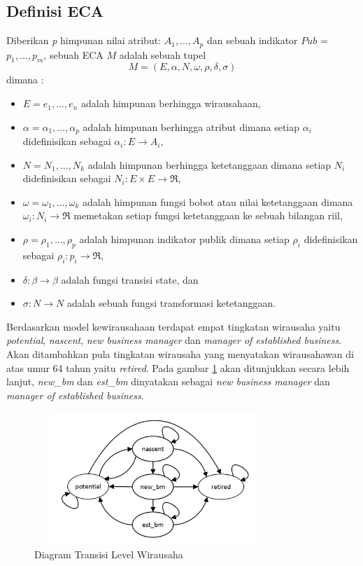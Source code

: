 \subsection{Definisi ECA}
Diberikan \textit{p} himpunan nilai atribut: $A_{1}, ..., A_{p}$ dan sebuah indikator $Pub$ = ${p_{1}, ..., p_{m}}$, sebuah ECA $M$ adalah sebuah tupel
\begin{displaymath}
	M = (E, \alpha, N, \omega, \rho, \delta, \sigma)
\end{displaymath}
dimana :
\begin{itemize}
	\item $E = {e_{1}, ..., e_{n}}$ adalah himpunan berhingga wirausahaan,
	\item $\alpha = {\alpha_{1}, ..., \alpha_{p}}$ adalah himpunan berhingga atribut dimana setiap $\alpha_{i}$ didefinisikan sebagai $\alpha_{i} : E \rightarrow A_{i}$,
	\item $N = {N_{1}, ..., N_{k}}$ adalah himpunan berhingga ketetanggaan dimana setiap $N_{i}$ didefinisikan sebagai $N_{i}:E \times E \rightarrow \Re$,
	\item $\omega = {\omega_{1}, ..., \omega_{k}}$ adalah himpunan fungsi bobot atau nilai ketetanggaan dimana $\omega_{i} : N_{i} \rightarrow \Re$ memetakan setiap fungsi ketetanggaan ke sebuah bilangan riil,
	\item $\rho = {\rho_{1}, ..., \rho_{p}}$ adalah himpunan indikator publik dimana setiap $\rho_{i}$ didefinisikan sebagai $\rho_{i} : p_{i} \rightarrow \Re$,
	\item $\delta : \beta \rightarrow \beta$ adalah fungsi transisi state, dan
	\item $\sigma : N \rightarrow N$ adalah sebuah fungsi transformasi ketetanggaan.
\end{itemize}


Berdasarkan model kewirausahaan terdapat empat tingkatan wirausaha yaitu \textit{potential}, \textit{nascent}, \textit{new business manager} dan \textit{manager of established business}. Akan ditambahkan pula tingkatan wirausaha yang menyatakan wirausahawan di atas umur 64 tahun yaitu \textit{retired}. Pada gambar \ref{fig:tingkatwirausaha} akan ditunjukkan secara lebih lanjut, \textit{new\_bm} dan \textit{est\_bm} dinyatakan sebagai \textit{new business manager} dan \textit{manager of established business}.


	\begin{figure} [H]
		\centering  
		\includegraphics[width=9cm, height=5cm]{tingkatwirausaha} 
		\caption[Diagram Transisi Level Wirausaha]{Diagram Transisi Level Wirausaha} 
		\label{fig:tingkatwirausaha} 
	\end{figure}


